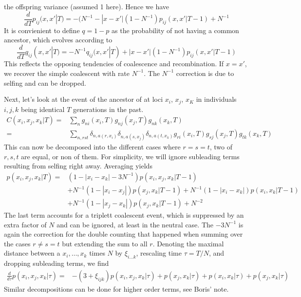 \documentclass{article}
\begin{document}
the offspring variance (assumed 1 here). Hence we have
\begin{equation}
   \frac{d}{dT} p_{ij}(x,x'|T) = -(N^{-1} - |x-x'|(1-N^{-1}) p_{ij}(x,x'|T-1) +N^{-1}
\end{equation}
It is convienient to define $q=1-p$ as the probability of not having a
common ancestor, which evolves according to
\begin{equation}
   \frac{d}{dT} q_{ij}(x,x'|T) = -N^{-1}q_{ij}(x,x'|T)+
   |x-x'|(1-N^{-1}) p_{ij}(x,x'|T-1)
\end{equation}
This reflects the opposing tendencies of coalescence and
recombination. If $x=x'$, we recover the simple coalescent with rate
$N^{-1}$. The $N^{-1}$ correction is due to selfing and can be
dropped. 

Next, let's look at the event of the ancestor of at loci $x_i$, $x_j$,
$x_K$ in individuals $i,j,k$ being identical $T$ generations in the
past. 
\begin{equation}
  \begin{split}
    C(x_i,x_j,x_k |T) =& \sum_n g_{ni}(x_i,T)g_{nj}(x_j,T)g_{nk}(x_k,T) \\
    =&
    \sum_{n,rst}\delta_{n,a(r,x_i)}\delta_{n,a(s,x_j)}\delta_{n,a(t,x_k)}
    g_{ri}(x_i,T)g_{sj}(x_j,T)g_{tk}(x_k,T)  
  \end{split}
\end{equation}
This can now be decomposed into the different cases where $r=s=t$,
two of $r,s,t$ are equal, or non of them. For simplicity, we will
ignore subleading terms resulting from selfing right away. Averaging
yields
\begin{equation}
  \label{eq:triple}
  \begin{split}
    p(x_i,x_j,x_k |T) =& (1-|x_i-x_k|-3N^{-1}) p(x_i,x_j,x_k |T-1) \\&
    + N^{-1}(1-|x_i-x_j|)p(x_j,x_k|T-1) 
    + N^{-1}(1-|x_i-x_k|)p(x_i,x_k|T-1) \\&
    + N^{-1}(1-|x_j-x_k|)p(x_j,x_k|T-1) + N^{-2}
  \end{split}
\end{equation}
The last term accounts for a triplett coalescent event, which is
suppressed by an extra factor of $N$ and can be ignored, at least in
the neutral case. The $-3N^{-1}$ is again the correction for the
double counting that happened when summing over the cases $r\neq s=t$
but extending the sum to all $r$.
Denoting the maximal distance between a $x_i,\dots,x_k$ times $N$
by $\xi_{i\ldots k}$, rescaling time $\tau = T/N$, and dropping
subleading terms, we find
\begin{equation}
  \begin{split}
   \frac{d}{d\tau} p(x_i,x_j,x_k |\tau) =& -(3+\xi_{ijk})p(x_i,x_j,x_k |\tau) 
    +p(x_j,x_k|\tau) 
    +p(x_i,x_k|\tau) 
    +p(x_j,x_k|\tau) 
  \end{split}
\end{equation}
Similar decompositions can be done for higher order terms, see Boris'
note.
\end{document}
